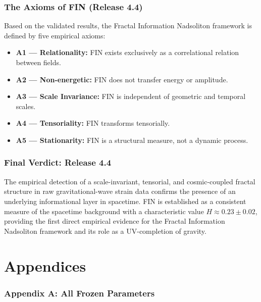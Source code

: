 \documentclass[11pt,a4paper]{book}
\theoremstyle{remark}
\begin{document}
\section{The Axioms of FIN (Release 4.4)}
Based on the validated results, the Fractal Information Nadsoliton framework is defined by five empirical axioms:
\begin{itemize}
    \item \textbf{A1 --- Relationality:} FIN exists exclusively as a correlational relation between fields.
    \item \textbf{A2 --- Non-energetic:} FIN does not transfer energy or amplitude.
    \item \textbf{A3 --- Scale Invariance:} FIN is independent of geometric and temporal scales.
    \item \textbf{A4 --- Tensoriality:} FIN transforms tensorially.
    \item \textbf{A5 --- Stationarity:} FIN is a structural measure, not a dynamic process.
\end{itemize}

\section{Final Verdict: Release 4.4}
The empirical detection of a scale-invariant, tensorial, and cosmic-coupled fractal structure in raw gravitational-wave strain data confirms the presence of an underlying informational layer in spacetime. FIN is established as a consistent measure of the spacetime background with a characteristic value $H \approx 0.23 \pm 0.02$, providing the first direct empirical evidence for the Fractal Information Nadsoliton framework and its role as a UV-completion of gravity.

\appendix
\part*{Appendices}

\section{Appendix A: All Frozen Parameters}
\end{document}
